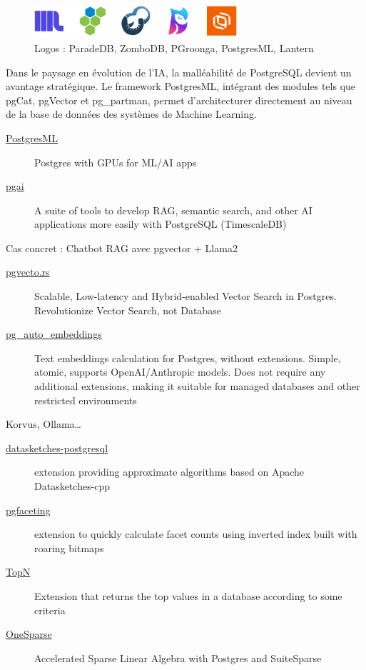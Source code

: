 \documentclass[a4paper,12pt]{article}
\begin{document}
\begin{multicols*}{2}
\begin{figure}[H]
\centering
\includegraphics[height=1.2cm]{icons/pg-search.pdf}
\caption{\label{fig:orgcebf87c}Logos : ParadeDB, ZomboDB, PGroonga, PostgresML, Lantern}
\end{figure}


Dans le paysage en évolution de l'IA, la malléabilité de PostgreSQL devient un avantage stratégique. Le framework PostgresML, intégrant des modules tels que pgCat, pgVector  et pg\_partman, permet d’architecturer directement au niveau de la base de données des systèmes de Machine Learning. 

\begin{description}
\item[{\href{https://github.com/postgresml/postgresml}{PostgresML}}] Postgres with GPUs for ML/AI apps
\item[{\href{https://github.com/timescale/pgai}{pgai}}] A suite of tools to develop RAG, semantic search, and other AI applications more easily with PostgreSQL (TimescaleDB)
\end{description}
Cas concret : Chatbot RAG avec pgvector + Llama2
\begin{description}
\item[{\href{https://github.com/tensorchord/pgvecto.rs}{pgvecto.rs}}] Scalable, Low-latency and Hybrid-enabled Vector Search in Postgres. Revolutionize Vector Search, not Database
\item[{\href{https://github.com/ElKornacio/pg\_auto\_embeddings}{pg\_auto\_embeddings}}] Text embeddings calculation for Postgres, without extensions. Simple, atomic, supports OpenAI/Anthropic models. Does not require any additional extensions, making it suitable for managed databases and other restricted environments
\end{description}

Korvus, Ollama\ldots{}

\begin{description}
\item[{\href{https://github.com/apache/datasketches-postgresql}{datasketches-postgresql}}] extension providing approximate algorithms based on Apache Datasketches-cpp
\item[{\href{https://github.com/cybertec-postgresql/pgfaceting}{pgfaceting}}] extension to quickly calculate facet counts using inverted index built with roaring bitmaps
\item[{\href{https://github.com/citusdata/postgresql-topn}{TopN}}] Extension that returns the top values in a database according to some criteria
\item[{\href{https://github.com/OneSparse/OneSparse}{OneSparse}}] Accelerated Sparse Linear Algebra with Postgres and SuiteSparse


\end{description}
\end{multicols*}
\end{document}
